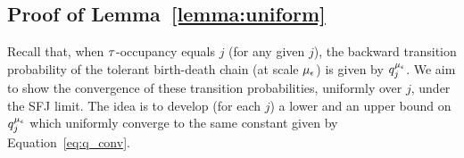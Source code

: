 \subsection{\bf Proof of Lemma~\ref{lemma:uniform}}
\label{sec:lemma:uniform}

Recall that, when ${\tau}$-occupancy equals $j$ (for any given $j$), the
backward transition probability of the tolerant birth-death chain (at
scale ${\mu_\epsilon}$) is given by $q_j^{\mu_\epsilon}$.  We aim to show the convergence
of these transition probabilities, uniformly over $j$, under the SFJ
limit.
%
The idea is to develop (for each $j$) a lower and an upper bound on
$q_j^{\mu_\epsilon}$ which uniformly converge to the same constant given by
Equation~\eqref{eq:q_conv}.


